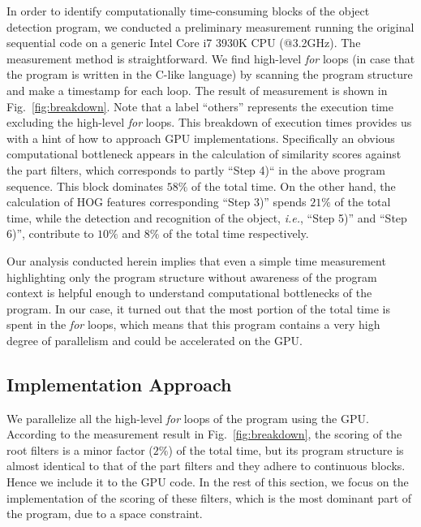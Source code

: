 In order to identify computationally time-consuming blocks of the object
detection program, we conducted a preliminary measurement running the
original sequential code \cite{Niknejad12} on a generic Intel Core i7
3930K CPU (@3.2GHz).
The measurement method is straightforward.
We find high-level \textit{for} loops (in case that the program is
written in the C-like language) by scanning the program structure and
make a timestamp for each loop.
The result of measurement is shown in Fig.~\ref{fig:breakdown}.
Note that a label ``others'' represents the execution time excluding
the high-level \textit{for} loops.
This breakdown of execution times provides us with a hint of how to
approach GPU implementations.
Specifically an obvious computational bottleneck appears in the
calculation of similarity scores against the part filters, which
corresponds to partly ``Step 4)`` in the above program sequence.
This block dominates $58\%$ of the total time.
On the other hand, the calculation of HOG features corresponding ``Step
3)'' spends $21\%$ of the total time, while the detection and recognition
of the object, \textit{i.e.}, ``Step 5)'' and ``Step 6)'', contribute to
$10\%$ and $8\%$ of the total time respectively.

Our analysis conducted herein implies that even a simple time
measurement highlighting only the program structure without awareness of
the program context is helpful enough to understand computational
bottlenecks of the program.
In our case, it turned out that the most portion of the total time is
spent in the \textit{for} loops, which means that this program contains
a very high degree of parallelism and could be accelerated on the GPU.

\subsection{Implementation Approach}

We parallelize all the high-level \textit{for} loops of the program
using the GPU.
According to the measurement result in Fig.~\ref{fig:breakdown}, the
scoring of the root filters is a minor factor ($2\%$) of the total
time, but its program structure is almost identical to that of the part
filters and they adhere to continuous blocks.
Hence we include it to the GPU code.
In the rest of this section, we focus on the implementation of the
scoring of these filters, which is the most dominant part of the
program, due to a space constraint.

